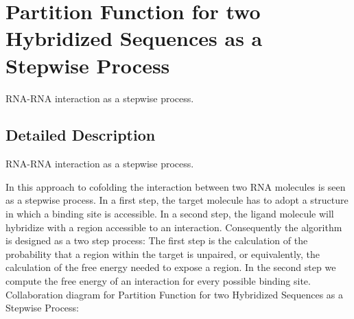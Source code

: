 \hypertarget{group__up__cofold}{}\section{Partition Function for two Hybridized Sequences as a Stepwise Process}
\label{group__up__cofold}


R\+N\+A-\/\+R\+NA interaction as a stepwise process.  




\subsection{Detailed Description}
R\+N\+A-\/\+R\+NA interaction as a stepwise process. 

In this approach to cofolding the interaction between two R\+NA molecules is seen as a stepwise process. In a first step, the target molecule has to adopt a structure in which a binding site is accessible. In a second step, the ligand molecule will hybridize with a region accessible to an interaction. Consequently the algorithm is designed as a two step process\+: The first step is the calculation of the probability that a region within the target is unpaired, or equivalently, the calculation of the free energy needed to expose a region. In the second step we compute the free energy of an interaction for every possible binding site. Collaboration diagram for Partition Function for two Hybridized Sequences as a Stepwise Process\+:
